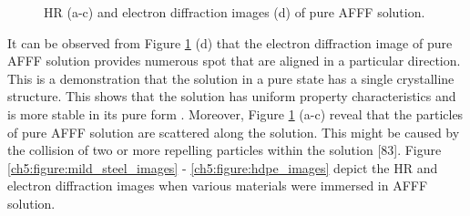 \documentclass[12pt]{report}
\begin{document}
\begin{figure}[H]
\caption{HR (a-c) and electron diffraction images (d) of pure AFFF solution.}
\label{ch5:figure:pure_afff_images}
\end{figure}

It can be observed from Figure \ref{ch5:figure:pure_afff_images} (d) that the electron diffraction image of pure AFFF solution provides numerous spot that are aligned in a particular direction. This is a demonstration that the solution in a pure state has a single crystalline structure. This shows that the solution has uniform property characteristics and is more stable in its pure form \cite{coates1996interpretation}.  Moreover, Figure \ref{ch5:figure:pure_afff_images} (a-c) reveal that the particles of pure AFFF solution are scattered along the solution. This might be caused by the collision of two or more repelling particles within the solution [83]. Figure \ref{ch5:figure:mild_steel_images} - \ref{ch5:figure:hdpe_images} depict the HR and electron diffraction images when various materials were immersed in AFFF solution. 
  
\end{document}
